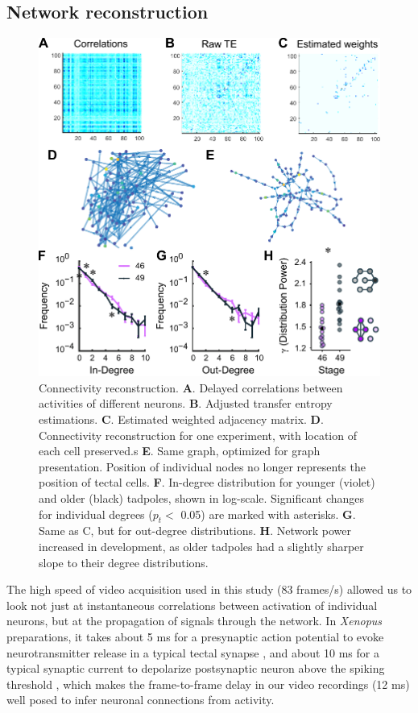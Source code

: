 \documentclass{article}
\begin{document}
\subsection*{Network reconstruction}

\begin{figure}[t!]
\includegraphics[width=\linewidth]{fig4.pdf}
\caption{
Connectivity reconstruction.  \textbf{A}. Delayed correlations between activities of different neurons. \textbf{B}. Adjusted transfer entropy estimations. \textbf{C}. Estimated weighted adjacency matrix. \textbf{D}. Connectivity reconstruction for one experiment, with location of each cell preserved.s \textbf{E}. Same graph, optimized for graph presentation. Position of individual nodes no longer represents the position of tectal cells. \textbf{F}. In-degree distribution for younger (violet) and older (black) tadpoles, shown in log-scale. Significant changes for individual degrees ($p_t<$ 0.05) are marked with asterisks. \textbf{G}. Same as C, but for out-degree distributions. \textbf{H}. Network power increased in development, as older tadpoles had a slightly sharper slope to their degree distributions. }
\end{figure}

The high speed of video acquisition used in this study (83 frames/s) allowed us to look not just at instantaneous correlations between activation of individual neurons, but at the propagation of signals through the network. In \textit{Xenopus} preparations, it takes about 5 ms for a presynaptic action potential to evoke neurotransmitter release in a typical tectal synapse \citep{khakhalin2012}, and about 10 ms for a typical synaptic current to depolarize postsynaptic neuron above the spiking threshold \citep{ciarleglio2015,busch2019}, which makes the frame-to-frame delay in our video recordings (12 ms) well posed to infer neuronal connections from activity.
\end{document}
